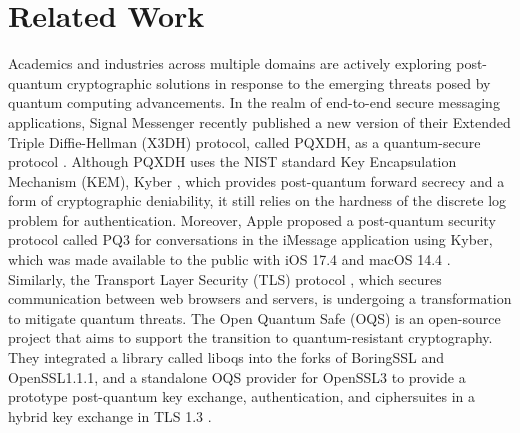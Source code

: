 \documentclass[a4paper,fleqn]{cas-dc}
\begin{document}
\section{Related Work}
\label{Related Work}

Academics and industries across multiple domains are actively exploring post-quantum cryptographic solutions in response to the emerging threats posed by quantum computing advancements.
In the realm of end-to-end secure messaging applications, Signal Messenger recently published a new version of their Extended Triple Diffie-Hellman (X3DH) protocol, called PQXDH, as a quantum-secure protocol \citep{Signal_pqxdh}. 
Although PQXDH uses the NIST standard Key Encapsulation Mechanism (KEM), Kyber \citep{kyber}, which provides post-quantum forward secrecy and a form of cryptographic deniability, it still relies on the hardness of the discrete log problem for authentication. 
Moreover, Apple proposed a post-quantum security protocol called PQ3 for conversations in the iMessage application using Kyber, which was made available to the public with iOS 17.4 and macOS 14.4 \citep{Apple_pq3}.  
 Similarly, the Transport Layer Security (TLS) protocol \citep{TLS}, which secures communication between web browsers and servers, is undergoing a transformation to mitigate quantum threats.  
 The Open Quantum Safe (OQS) \citep{OQS_project} is an open-source project that aims to support the transition to quantum-resistant cryptography.  
 They integrated a library called liboqs into the forks of BoringSSL and OpenSSL1.1.1, and a standalone OQS provider for OpenSSL3 to provide a prototype post-quantum key exchange, authentication, and ciphersuites in a hybrid key exchange in TLS 1.3 \citep{hybrid_key_exchange_TLS_1.3}.  
 
\end{document}
